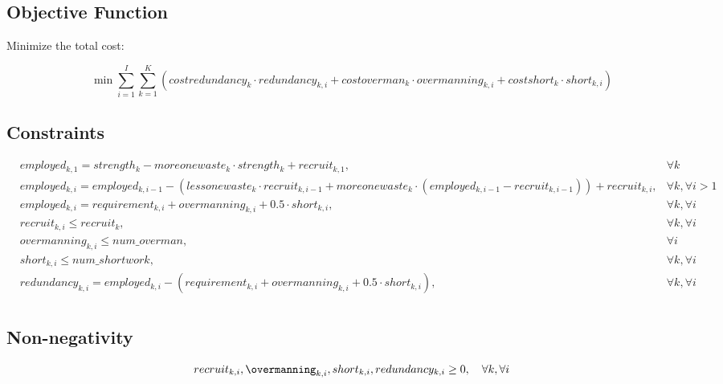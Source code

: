 \documentclass{article}
\begin{document}
\subsection*{Objective Function}
Minimize the total cost:

\[
\min \sum_{i=1}^{I} \sum_{k=1}^{K} \left( costredundancy_k \cdot redundancy_{k,i} + costoverman_k \cdot overmanning_{k,i} + costshort_k \cdot short_{k,i} \right)
\]

\subsection*{Constraints}
\begin{align}
& employed_{k,1} = strength_k - moreonewaste_k \cdot strength_k + recruit_{k,1}, & \forall k \\
& employed_{k,i} = employed_{k,i-1} - (lessonewaste_k \cdot recruit_{k,i-1} + moreonewaste_k \cdot (employed_{k,i-1} - recruit_{k,i-1})) + recruit_{k,i}, & \forall k, \forall i > 1 \\
& employed_{k,i} = requirement_{k,i} + overmanning_{k,i} + 0.5 \cdot short_{k,i}, & \forall k, \forall i \\
& recruit_{k,i} \leq recruit_k, & \forall k, \forall i \\
& overmanning_{k,i} \leq num\_overman, & \forall i \\
& short_{k,i} \leq num\_shortwork, & \forall k, \forall i \\
& redundancy_{k,i} = employed_{k,i} - (requirement_{k,i} + overmanning_{k,i} + 0.5 \cdot short_{k,i}), & \forall k, \forall i \\
\end{align}

\subsection*{Non-negativity}
\[
recruit_{k,i}, \overmanning_{k,i}, short_{k,i}, redundancy_{k,i} \geq 0, \quad \forall k, \forall i
\]
\end{document}
